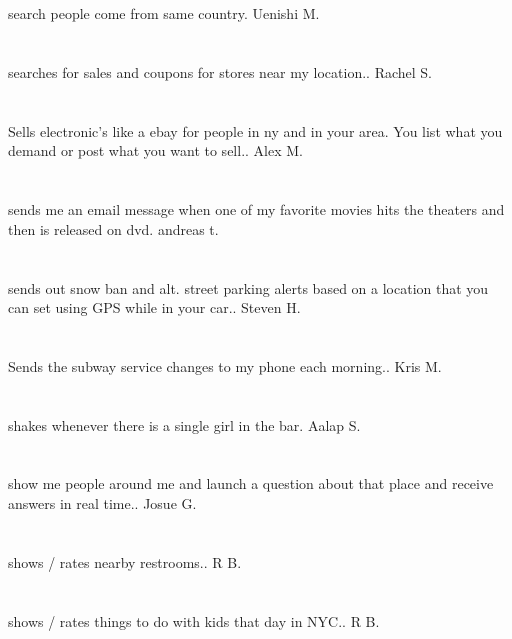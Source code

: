 \section{}search people come from same country. Uenishi M.
\section{}searches for sales and coupons for stores near my location.. Rachel S.
\section{}Sells electronic's like a ebay for people in ny and in your area. You list what you demand or post what you want to sell.. Alex M.
\section{}sends me an email message when one of my favorite movies hits the theaters and then is released on dvd. andreas t.
\section{}sends out snow ban and alt. street parking alerts based on a location that you can set using GPS while in your car.. Steven H.
\section{}Sends the subway service changes to my phone each morning.. Kris M.
\section{}shakes whenever there is a single girl in the bar. Aalap S.
\section{}show me people around me and launch a question about that place and receive answers in real time.. Josue G.
\section{}shows / rates nearby restrooms.. R B.
\section{}shows / rates things to do with kids that day in NYC.. R B.
